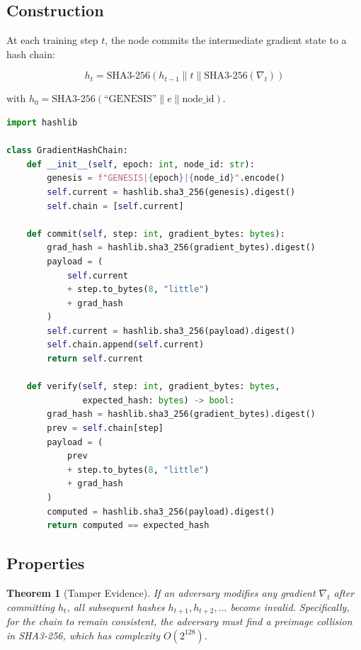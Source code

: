 \documentclass[11pt,letterpaper]{article}
\newtheorem{theorem}{Theorem}[section]
\begin{document}
\subsection{Construction}

At each training step $t$, the node commits the intermediate gradient state to a hash chain:

\begin{equation}
    h_t = \text{SHA3-256}\!\left(h_{t-1} \| t \| \text{SHA3-256}(\nabla_t)\right)
    \label{eq:hashchain}
\end{equation}

with $h_0 = \text{SHA3-256}(\text{``GENESIS''} \| e \| \text{node\_id})$.

\begin{lstlisting}[language=python,caption=Gradient hash chain (Python)]
import hashlib

class GradientHashChain:
    def __init__(self, epoch: int, node_id: str):
        genesis = f"GENESIS|{epoch}|{node_id}".encode()
        self.current = hashlib.sha3_256(genesis).digest()
        self.chain = [self.current]

    def commit(self, step: int, gradient_bytes: bytes):
        grad_hash = hashlib.sha3_256(gradient_bytes).digest()
        payload = (
            self.current
            + step.to_bytes(8, "little")
            + grad_hash
        )
        self.current = hashlib.sha3_256(payload).digest()
        self.chain.append(self.current)
        return self.current

    def verify(self, step: int, gradient_bytes: bytes,
               expected_hash: bytes) -> bool:
        grad_hash = hashlib.sha3_256(gradient_bytes).digest()
        prev = self.chain[step]
        payload = (
            prev
            + step.to_bytes(8, "little")
            + grad_hash
        )
        computed = hashlib.sha3_256(payload).digest()
        return computed == expected_hash
\end{lstlisting}

\subsection{Properties}

\begin{theorem}[Tamper Evidence]
If an adversary modifies any gradient $\nabla_t$ after committing $h_t$, all subsequent hashes $h_{t+1}, h_{t+2}, \ldots$ become invalid.  Specifically, for the chain to remain consistent, the adversary must find a preimage collision in SHA3-256, which has complexity $O(2^{128})$.
\end{theorem}
\end{document}
